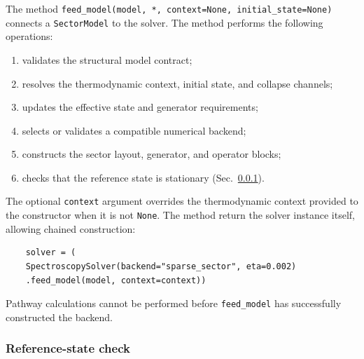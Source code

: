 \documentclass[11pt]{article}
\begin{document}
The method \texttt{feed\_model(model, *, context=None, initial\_state=None)} connects a \texttt{SectorModel} to the solver. The method performs the following operations:
\begin{enumerate}
    \item validates the structural model contract;
    \item resolves the thermodynamic context, initial state, and collapse channels;
    \item updates the effective state and generator requirements;
    \item selects or validates a compatible numerical backend;
    \item constructs the sector layout, generator, and operator blocks;
    \item checks that the reference state is stationary (Sec.~\ref{sec:stationarity}).
\end{enumerate}
The optional \texttt{context} argument overrides the thermodynamic context provided to the constructor when it is not \texttt{None}. The method return the solver instance itself, allowing chained construction:
\begin{verbatim}
    solver = (
    SpectroscopySolver(backend="sparse_sector", eta=0.002)
    .feed_model(model, context=context))
\end{verbatim}

Pathway calculations cannot be performed before \texttt{feed\_model} has successfully constructed the backend.

\subsubsection{Reference-state check}
\label{sec:stationarity}
\end{document}
